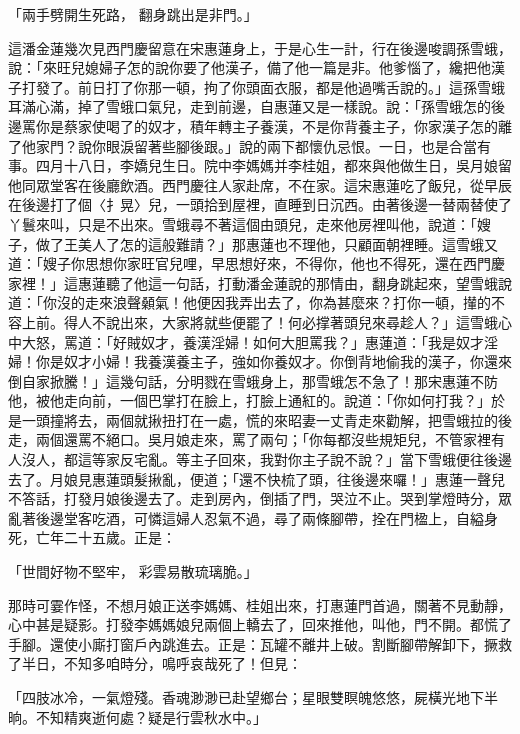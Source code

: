 「兩手劈開生死路，  翻身跳出是非門。」

這潘金蓮幾次見西門慶留意在宋惠蓮身上，于是心生一計，行在後邊唆調孫雪蛾，說：「來旺兒媳婦子怎的說你要了他漢子，備了他一篇是非。他爹惱了，纔把他漢子打發了。前日打了你那一頓，拘了你頭面衣服，都是他過嘴舌說的。」這孫雪蛾耳滿心滿，掉了雪蛾口氣兒，走到前邊，自惠蓮又是一樣說。說：「孫雪蛾怎的後邊罵你是蔡家使喝了的奴才，積年轉主子養漢，不是你背養主子，你家漢子怎的離了他家門？說你眼淚留著些腳後跟。」說的兩下都懷仇忌恨。一日，也是合當有事。四月十八日，李嬌兒生日。院中李媽媽并李桂姐，都來與他做生日，吳月娘留他同眾堂客在後廳飲酒。西門慶往人家赴席，不在家。這宋惠蓮吃了飯兒，從早辰在後邊打了個〈扌晃〉兒，一頭拾到屋裡，直睡到日沉西。由著後邊一替兩替使了丫鬟來叫，只是不出來。雪蛾尋不著這個由頭兒，走來他房裡叫他，說道：「嫂子，做了王美人了怎的這般難請？」那惠蓮也不理他，只顧面朝裡睡。這雪蛾又道：「嫂子你思想你家旺官兒哩，早思想好來，不得你，他也不得死，還在西門慶家裡！」這惠蓮聽了他這一句話，打動潘金蓮說的那情由，翻身跳起來，望雪蛾說道：「你沒的走來浪聲顙氣！他便因我弄出去了，你為甚麼來？打你一頓，攆的不容上前。得人不說出來，大家將就些便罷了！何必撑著頭兒來尋趁人？」這雪蛾心中大怒，罵道：「好賊奴才，養漢淫婦！如何大胆罵我？」惠蓮道：「我是奴才淫婦！你是奴才小婦！我養漢養主子，強如你養奴才。你倒背地偷我的漢子，你還來倒自家掀騰！」這幾句話，分明戮在雪蛾身上，那雪蛾怎不急了！那宋惠蓮不防他，被他走向前，一個巴掌打在臉上，打臉上通紅的。說道：「你如何打我？」於是一頭撞將去，兩個就揪扭打在一處，慌的來昭妻一丈青走來勸解，把雪蛾拉的後走，兩個還罵不絕口。吳月娘走來，罵了兩句；「你每都沒些規矩兒，不管家裡有人沒人，都這等家反宅亂。等主子回來，我對你主子說不說？」當下雪蛾便往後邊去了。月娘見惠蓮頭髮揪亂，便道；「還不快梳了頭，往後邊來囉！」惠蓮一聲兒不答話，打發月娘後邊去了。走到房內，倒插了門，哭泣不止。哭到掌燈時分，眾亂著後邊堂客吃酒，可憐這婦人忍氣不過，尋了兩條腳帶，拴在門楹上，自縊身死，亡年二十五歲。正是：

「世間好物不堅牢，  彩雲易散琉璃脆。」

那時可霎作怪，不想月娘正送李媽媽、桂姐出來，打惠蓮門首過，關著不見動靜，心中甚是疑影。打發李媽媽娘兒兩個上轎去了，回來推他，叫他，門不開。都慌了手腳。還使小廝打窗戶內跳進去。正是：瓦罐不離井上破。割斷腳帶解卸下，撅救了半日，不知多咱時分，鳴呼哀哉死了！但見：

「四肢冰冷，一氣燈殘。香魂渺渺已赴望鄉台；星眼雙瞑魄悠悠，屍橫光地下半晌。不知精爽逝何處？疑是行雲秋水中。」

